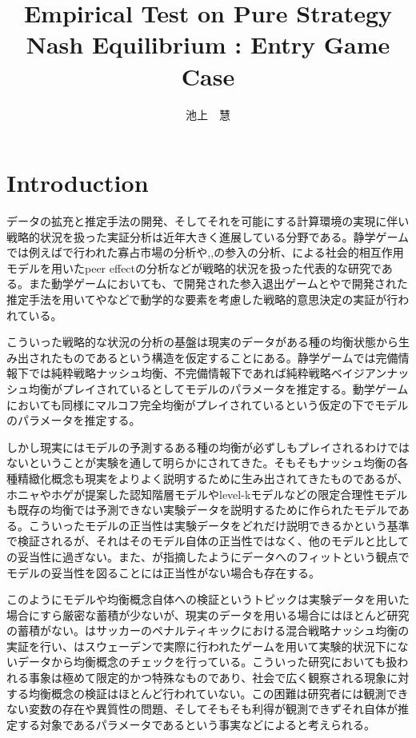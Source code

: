\documentclass{jsarticle}
\begin{document}
\title{Empirical Test on Pure Strategy Nash Equilibrium : Entry Game Case}
\author{池上　慧}
\maketitle

\section{Introduction}
データの拡充と推定手法の開発、そしてそれを可能にする計算環境の実現に伴い戦略的状況を扱った実証分析は近年大きく進展している分野である。静学ゲームでは例えば\cite{1}で行われた寡占市場の分析や\cite{2},\cite{3},\cite{4}の参入の分析、\cite{5}による社会的相互作用モデルを用いたpeer effectの分析などが戦略的状況を扱った代表的な研究である。また動学ゲームにおいても、\cite{6}で開発された参入退出ゲームと\cite{9}や\cite{10}で開発された推定手法を用いて\cite{7}や\cite{8}などで動学的な要素を考慮した戦略的意思決定の実証が行われている。

こういった戦略的な状況の分析の基盤は現実のデータがある種の均衡状態から生み出されたものであるという構造を仮定することにある。静学ゲームでは完備情報下では純粋戦略ナッシュ均衡、不完備情報下であれば純粋戦略ベイジアンナッシュ均衡がプレイされているとしてモデルのパラメータを推定する。動学ゲームにおいても同様にマルコフ完全均衡がプレイされているという仮定の下でモデルのパラメータを推定する。

しかし現実にはモデルの予測するある種の均衡が必ずしもプレイされるわけではないということが実験を通して明らかにされてきた。そもそもナッシュ均衡の各種精緻化概念も現実をよりよく説明するために生み出されてきたものであるが、ホニャやホゲが提案した認知階層モデルやlevel-kモデルなどの限定合理性モデルも既存の均衡では予測できない実験データを説明するために作られたモデルである。こういったモデルの正当性は実験データをどれだけ説明できるかという基準で検証されるが、それはそのモデル自体の正当性ではなく、他のモデルと比しての妥当性に過ぎない。また、\cite{12}が指摘したようにデータへのフィットという観点でモデルの妥当性を図ることには正当性がない場合も存在する。

このようにモデルや均衡概念自体への検証というトピックは実験データを用いた場合にすら厳密な蓄積が少ないが、現実のデータを用いる場合にはほとんど研究の蓄積がない。\cite{13}はサッカーのペナルティキックにおける混合戦略ナッシュ均衡の実証を行い、\cite{11}はスウェーデンで実際に行われたゲームを用いて実験的状況下にないデータから均衡概念のチェックを行っている。こういった研究においても扱われる事象は極めて限定的かつ特殊なものであり、社会で広く観察される現象に対する均衡概念の検証はほとんど行われていない。この困難は研究者には観測できない変数の存在や異質性の問題、そしてそもそも利得が観測できずそれ自体が推定する対象であるパラメータであるという事実などによると考えられる。
\end{document}

